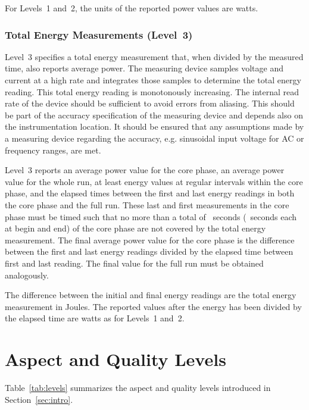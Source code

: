 For Levels~1 and~2, the units of the reported power values are watts.

\subsubsection{Total Energy Measurements (Level~3)}

Level~3 specifies a total energy measurement that, when divided by the measured time, also reports average power.
The measuring device samples voltage and current at a high rate and integrates those samples to determine the total energy reading.
This total energy reading is monotonously increasing.
The internal read rate of the device should be sufficient to avoid errors from aliasing.
This should be part of the accuracy specification of the measuring device and depends also on the instrumentation location.
It should be ensured that any assumptions made by a measuring device regarding the accuracy, e.g. sinusoidal input voltage for AC or frequency ranges, are met.

Level~3 reports an average power value for the core phase, an average power value for the whole run, at least \MinMeasurementsCorePhaseLTwoThree{} energy values at regular intervals within the core phase, and the elapsed times between the first and last energy readings in both the core phase and the full run.
These last and first measurements in the core phase must be timed such that no more than a total of \MaxSecMissingLThree{}~seconds (\MaxSecMissingLThreeHalf{}~seconds each at begin and end) of the core phase are not covered by the total energy measurement.
The final average power value for the core phase is the difference between the first and last energy readings divided by the elapsed time between first and last reading.
The final value for the full run must be obtained analogously.

The difference between the initial and final energy readings are the total energy measurement in Joules.
The reported values after the energy has been divided by the elapsed time are watts as for Levels~1 and~2.

\section{Aspect and Quality Levels}
\label{sec:AQLevels}

Table~\ref{tab:levels} summarizes the aspect and quality levels introduced in Section~\ref{sec:intro}. 

